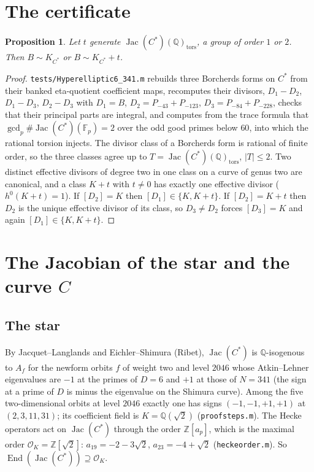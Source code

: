 \documentclass[11pt,reqno]{amsart}
\theoremstyle{plain}
\newtheorem{proposition}[theorem]{Proposition}
\theoremstyle{definition}
\DeclareMathOperator{\Jac}{Jac}
\DeclareMathOperator{\End}{End}
\newcommand{\Q}{\mathbb{Q}}
\newcommand{\Z}{\mathbb{Z}}
\newcommand{\F}{\mathbb{F}}
\newcommand{\OK}{\mathcal{O}_K}
\begin{document}
\section{The certificate}\label{sec:cert}

\begin{proposition}\label{prop:cert}
Let $t$ generate $\Jac(C^*)(\Q)_{\mathrm{tors}}$, a group of order $1$ or $2$. Then
$B\sim K_{C^*}$ or $B\sim K_{C^*}+t$.
\end{proposition}
\begin{proof}
\texttt{tests/Hyperelliptic6\_341.m} rebuilds three Borcherds forms on $C^*$ from their banked
eta-quotient coefficient maps, recomputes their divisors, $D_1-D_2$, $D_1-D_3$, $D_2-D_3$ with
$D_1=B$, $D_2=P_{-43}+P_{-123}$, $D_3=P_{-84}+P_{-228}$, checks that their principal parts are
integral, and computes from the trace formula that $\gcd_p\#\Jac(C^*)(\F_p)=2$ over the odd good
primes below $60$, into which the rational torsion injects. The divisor class of a Borcherds form is
rational of finite order, so the three classes agree up to $T=\Jac(C^*)(\Q)_{\mathrm{tors}}$,
$|T|\le2$. Two distinct effective divisors of degree two in one class on a curve of genus two are
canonical, and a class $K+t$ with $t\ne0$ has exactly one effective divisor ($h^0(K+t)=1$). If
$[D_2]=K$ then $[D_1]\in\{K,K+t\}$. If $[D_2]=K+t$ then $D_2$ is the unique effective divisor of its
class, so $D_3\ne D_2$ forces $[D_3]=K$ and again $[D_1]\in\{K,K+t\}$.
\end{proof}

\section{The Jacobian of the star and the curve $C$}\label{sec:class}

\subsection*{The star} By Jacquet--Langlands and Eichler--Shimura (Ribet), $\Jac(C^*)$ is
$\Q$-isogenous to $A_f$ for the newform orbits $f$ of weight two and level $2046$ whose
Atkin--Lehner eigenvalues are $-1$ at the primes of $D=6$ and $+1$ at those of $N=341$ (the sign at a
prime of $D$ is minus the eigenvalue on the Shimura curve). Among the five two-dimensional orbits at
level $2046$ exactly one has signs $(-1,-1,+1,+1)$ at $(2,3,11,31)$; its coefficient field is
$K=\Q(\sqrt2)$ (\texttt{proofsteps.m}). The Hecke operators act on $\Jac(C^*)$ through the order
$\Z[a_p]$, which is the maximal order $\OK=\Z[\sqrt2]$: $a_{19}=-2-3\sqrt2$, $a_{23}=-4+\sqrt2$
(\texttt{heckeorder.m}). So $\End(\Jac(C^*))\supseteq\OK$.
\end{document}
